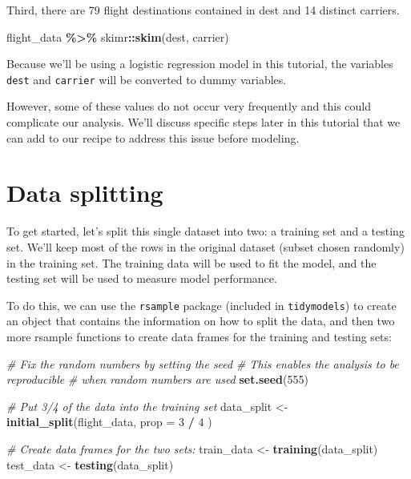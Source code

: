 \documentclass[
]{book}
\newenvironment{Shaded}{\begin{snugshade}}{\end{snugshade}}
\newcommand{\CommentTok}[1]{\textcolor[rgb]{0.56,0.35,0.01}{\textit{#1}}}
\newcommand{\DataTypeTok}[1]{\textcolor[rgb]{0.13,0.29,0.53}{#1}}
\newcommand{\DecValTok}[1]{\textcolor[rgb]{0.00,0.00,0.81}{#1}}
\newcommand{\KeywordTok}[1]{\textcolor[rgb]{0.13,0.29,0.53}{\textbf{#1}}}
\newcommand{\NormalTok}[1]{#1}
\newcommand{\OperatorTok}[1]{\textcolor[rgb]{0.81,0.36,0.00}{\textbf{#1}}}
\newcommand{\StringTok}[1]{\textcolor[rgb]{0.31,0.60,0.02}{#1}}
\begin{document}
Third, there are 79 flight destinations contained in dest and 14 distinct carriers.

\begin{Shaded}
\begin{Highlighting}[]
\NormalTok{flight\_data }\OperatorTok{\%\textgreater{}\%}
\StringTok{  }\NormalTok{skimr}\OperatorTok{::}\KeywordTok{skim}\NormalTok{(dest, carrier)}
\end{Highlighting}
\end{Shaded}

Because we'll be using a logistic regression model in this tutorial, the variables \texttt{dest} and \texttt{carrier} will be converted to dummy variables.

However, some of these values do not occur very frequently and this could complicate our analysis. We'll discuss specific steps later in this tutorial that we can add to our recipe to address this issue before modeling.

\hypertarget{data-splitting-2}{%
\chapter{Data splitting}\label{data-splitting-2}}

To get started, let's split this single dataset into two: a training set and a testing set. We'll keep most of the rows in the original dataset (subset chosen randomly) in the training set. The training data will be used to fit the model, and the testing set will be used to measure model performance.

To do this, we can use the \texttt{rsample} package (included in \texttt{tidymodels}) to create an object that contains the information on how to split the data, and then two more rsample functions to create data frames for the training and testing sets:

\begin{Shaded}
\begin{Highlighting}[]
\CommentTok{\# Fix the random numbers by setting the seed}
\CommentTok{\# This enables the analysis to be reproducible}
\CommentTok{\# when random numbers are used}
\KeywordTok{set.seed}\NormalTok{(}\DecValTok{555}\NormalTok{)}

\CommentTok{\# Put 3/4 of the data into the training set}
\NormalTok{data\_split \textless{}{-}}\StringTok{ }\KeywordTok{initial\_split}\NormalTok{(flight\_data,}
  \DataTypeTok{prop =} \DecValTok{3} \OperatorTok{/}\StringTok{ }\DecValTok{4}
\NormalTok{)}

\CommentTok{\# Create data frames for the two sets:}
\NormalTok{train\_data \textless{}{-}}\StringTok{ }\KeywordTok{training}\NormalTok{(data\_split)}
\NormalTok{test\_data \textless{}{-}}\StringTok{ }\KeywordTok{testing}\NormalTok{(data\_split)}
\end{Highlighting}
\end{Shaded}
\end{document}
